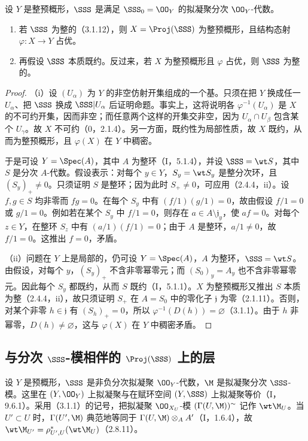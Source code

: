设 $Y$ 是整预概形，$\SSS$ 是满足 $\SSS_0=\OO_Y$ 的拟凝聚分次 $\OO_Y$-代数。
\begin{enumerate}[label=(\roman*)]
\item 若 $\SSS$ 为整的（3.1.12），则 $X=\Proj(\SSS)$ 为整预概形，且结构态射 $\varphi:X\to Y$ 占优。
\item 再假设 $\SSS$ 本质既约。反过来，若 $X$ 为整预概形且 $\varphi$ 占优，则 $\SSS$ 为整的。
\end{enumerate}
\begin{proof}
（i）设 $(U_\alpha)$ 为 $Y$ 的非空仿射开集组成的一个基。只须在把 $Y$ 换成任一 $U_\alpha$、把 $\SSS$ 换成 $\SSS|U_\alpha$ 后证明命题。事实上，这将说明各 $\varphi^{-1}(U_\alpha)$ 是 $X$ 的不可约开集，因而非空；而任意两个这样的开集交非空，因为 $U_\alpha\cap U_\beta$ 包含某个 $U_\gamma$。故 $X$ 不可约（0，2.1.4）。另一方面，既约性为局部性质，故 $X$ 既约，从而为整预概形，且 $\varphi(X)$ 在 $Y$ 中稠密。

于是可设 $Y=\Spec(A)$，其中 $A$ 为整环（I，5.1.4），并设 $\SSS=\wt S$，其中 $S$ 是分次 $A$-代数。假设表示：对每个 $y\in Y$，$S_y=\wt S_y$ 是整分次环，且 $(S_y)_+\ne0$。只须证明 $S$ 是整环；因为此时 $S_+\ne0$，可应用（2.4.4，ii）。设 $f,g\in S$ 均非零而 $fg=0$。在每个 $S_y$ 中有 $(f/1)(g/1)=0$，故由假设 $f/1=0$ 或 $g/1=0$。例如若在某个 $S_y$ 中 $f/1=0$，则存在 $a\in A\setminus\mathfrak j_y$，使 $af=0$。对每个 $z\in Y$，在整环 $S_z$ 中有 $(a/1)(f/1)=0$；由于 $A$ 是整环，$a/1\ne0$，故 $f/1=0$。这推出 $f=0$，矛盾。

（ii）问题在 $Y$ 上是局部的，仍可设 $Y=\Spec(A)$，$A$ 为整环，$\SSS=\wt S$。由假设，对每个 $y$，$(S_y)_+$ 不含非零幂零元；而 $(S_0)_y=A_y$ 也不含非零幂零元。因此每个 $S_y$ 都既约，从而 $S$ 既约（I，5.1.1）。$X$ 为整预概形又推出 $S$ 本质为整（2.4.4，ii），故只须证明 $S_+$ 在 $A=S_0$ 中的零化子 $\mathfrak j$ 为零（2.1.11）。否则，对某个非零 $h\in\mathfrak j$ 有 $(S_h)_+=0$，所以 $\varphi^{-1}(D(h))=\varnothing$（3.1.1）。由于 $h$ 非幂零，$D(h)\ne\varnothing$，这与 $\varphi(X)$ 在 $Y$ 中稠密矛盾。
\end{proof}

\subsection{与分次 \texorpdfstring{$\SSS$}{S}-模相伴的 \texorpdfstring{$\Proj(\SSS)$}{Proj(S)} 上的层}
设 $Y$ 是预概形，$\SSS$ 是非负分次拟凝聚 $\OO_Y$-代数，$\M$ 是拟凝聚分次 $\SSS$-模。这里在 $(Y,\OO_Y)$ 上拟凝聚与在赋环空间 $(Y,\SSS)$ 上拟凝聚等价（I，9.6.1）。采用（3.1.1）的记号，把拟凝聚 $\OO_{X_U}$-模 $(\Gamma(U,\M))^\sim$ 记作 $\wt\M_U$。当 $U'\subset U$ 时，$\Gamma(U',\M)$ 典范地等同于 $\Gamma(U,\M)\otimes_A A'$（I，1.6.4），故
$\wt\M_{U'}=\rho_{U',U}^*(\wt\M_U)$（2.8.11）。

